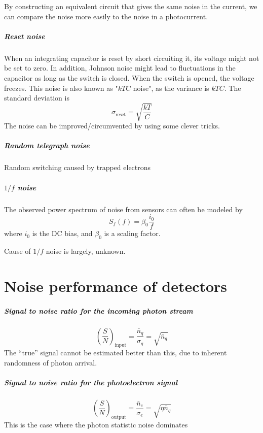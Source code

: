 \documentclass[article]{memoir}
\begin{document}
By constructing an equivalent circuit that gives the same noise in the current, we can compare the noise more easily to the noise in a photocurrent.

\paragraph{Reset noise}
When an integrating capacitor is reset by short circuiting it, its voltage might not be set to zero. In addition, Johnson noise might lead to fluctuations in the capacitor as long as the switch is closed. When the switch is opened, the voltage freezes. This noise is also known as "\(kTC\) noise", as the variance is \(kTC\). The standard deviation is
\[
    \sigma_{\text{reset}} = \sqrt{\frac{kT}{C}}
\]
The noise can be improved/circumvented by using some clever tricks.

\paragraph{Random telegraph noise}
Random switching caused by trapped electrons

\paragraph{\(1/f\) noise}
The observed power spectrum of noise from sensors can often be modeled by
\[
    S_f(f) = \beta_0 \frac{i_0}{f}
\]
where \(i_0\) is the DC bias, and \(\beta_0\) is a scaling factor.

Cause of \(1/f\) noise is largely, unknown. 

\chapter{Noise performance of detectors}

\paragraph{Signal to noise ratio for the incoming photon stream}
\[
    \left(\frac{S}{N}\right)_\text{input} = \frac{\bar n_q}{\sigma_q} = \sqrt{\bar n_q}
\]
The ``true'' signal cannot be estimated better than this, due to inherent randomness of photon arrival.

\paragraph{Signal to noise ratio for the photoelectron signal}
\[
    \left(\frac{S}{N}\right)_\text{output} = \frac{\bar n_e}{\sigma_e} = \sqrt{\eta \bar n_q}
\]
This is the case where the photon statistic noise dominates
\end{document}
